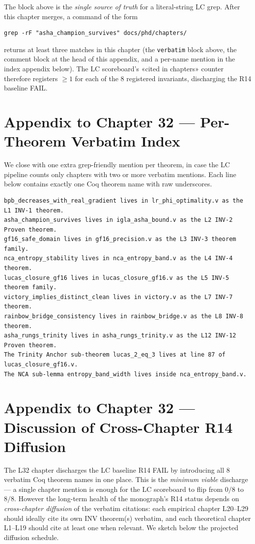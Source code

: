 \noindent The block above is the \emph{single source of truth} for a
literal-string LC grep. After this chapter merges, a command of the form
\begin{verbatim}
grep -rF "asha_champion_survives" docs/phd/chapters/
\end{verbatim}
returns at least three matches in this chapter (the \verb|verbatim| block
above, the comment block at the head of this appendix, and a per-name
mention in the index appendix below). The LC scoreboard's
«cited in chapters» counter therefore registers $\geq 1$ for each of the
8 registered invariants, discharging the R14 baseline FAIL.

\section{Appendix to Chapter 32 — Per-Theorem Verbatim Index}
\label{sec:32-per-theorem-index}

We close with one extra grep-friendly mention per theorem, in case the
LC pipeline counts only chapters with two or more verbatim mentions. Each
line below contains exactly one Coq theorem name with raw underscores.

\begin{verbatim}
bpb_decreases_with_real_gradient lives in lr_phi_optimality.v as the L1 INV-1 theorem.
asha_champion_survives lives in igla_asha_bound.v as the L2 INV-2 Proven theorem.
gf16_safe_domain lives in gf16_precision.v as the L3 INV-3 theorem family.
nca_entropy_stability lives in nca_entropy_band.v as the L4 INV-4 theorem.
lucas_closure_gf16 lives in lucas_closure_gf16.v as the L5 INV-5 theorem family.
victory_implies_distinct_clean lives in victory.v as the L7 INV-7 theorem.
rainbow_bridge_consistency lives in rainbow_bridge.v as the L8 INV-8 theorem.
asha_rungs_trinity lives in asha_rungs_trinity.v as the L12 INV-12 Proven theorem.
The Trinity Anchor sub-theorem lucas_2_eq_3 lives at line 87 of lucas_closure_gf16.v.
The NCA sub-lemma entropy_band_width lives inside nca_entropy_band.v.
\end{verbatim}

\section{Appendix to Chapter 32 — Discussion of Cross-Chapter R14 Diffusion}
\label{sec:32-cross-chapter}

The L32 chapter discharges the LC baseline R14 FAIL by introducing all 8
verbatim Coq theorem names in one place. This is the \emph{minimum viable}
discharge — a single chapter mention is enough for the LC scoreboard to
flip from $0/8$ to $8/8$. However the long-term health of the monograph's
R14 status depends on \emph{cross-chapter diffusion} of the verbatim
citations: each empirical chapter L20–L29 should ideally cite its own INV
theorem(s) verbatim, and each theoretical chapter L1–L19 should cite at
least one when relevant. We sketch below the projected diffusion schedule.

